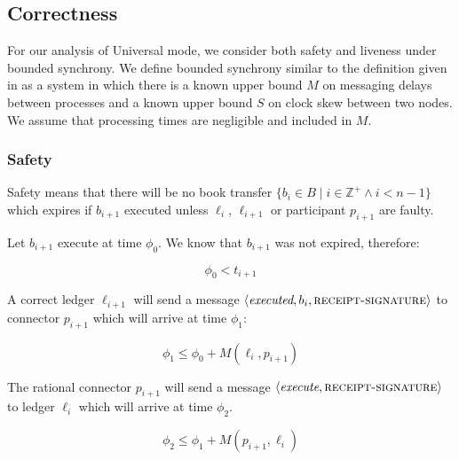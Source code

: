 \documentclass[letterpaper,twocolumn,10pt]{article}
\begin{document}

\subsection{Correctness}


For our analysis of Universal mode, we consider both safety and liveness under bounded synchrony. We define bounded synchrony similar to the definition given in \cite{dwork1988consensus} as a system in which there is a known upper bound $M$ on messaging delays between processes and a known upper bound $S$ on clock skew between two nodes. We assume that processing times are negligible and included in $M$.

\subsubsection{Safety}



Safety means that there will be no book transfer $ \{ b_i \in B \mid i \in \mathbb{Z}^+ \land i < n-1 \} $ which expires if $b_{i+1}$ executed unless $\ell_i$, $\ell_{i+1}$ or participant $p_{i+1}$ are faulty.

Let $b_{i+1}$ execute at time $\phi_0$. We know that $b_{i+1}$ was not expired, therefore:

\begin{equation}
\label{eq:phi0}
\phi_0 < t_{i+1}
\end{equation}

A correct ledger $\ell_{i+1}$ will send a message $\langle\textit{executed}, b_i, \textsc{receipt-signature}\rangle$ to connector $p_{i+1}$ which will arrive at time $\phi_1$:

\begin{equation}
\label{eq:phi1}
\phi_1 \leq \phi_0 + M(\ell_i, p_{i+1})
\end{equation}

The rational connector $p_{i+1}$ will send a message $\langle\textit{execute}, \textsc{receipt-signature}\rangle$ to ledger $\ell_i$ which will arrive at time $\phi_2$.

\begin{equation}
\label{eq:phi2}
\phi_2 \leq \phi_1 + M(p_{i+1}, \ell_i)
\end{equation}
\end{document}
